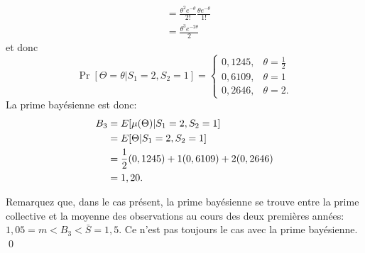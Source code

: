 \begin{exemple}
\begin{enumerate}[a)]
\begin{align*}
      &= \frac{\theta^2 e^{-\theta}}{2!} \frac{\theta e^{-\theta}}{1!} \\
      &= \frac{\theta^3 e^{-2\theta}}{2}
    \end{align*}
    et donc
    \begin{equation*}
      \Pr[\Theta = \theta|S_1 = 2, S_2 = 1] =
      \begin{cases}
        0,1245, & \theta = \frac{1}{2} \\
        0,6109, & \theta = 1 \\
        0,2646, & \theta = 2.
      \end{cases}
    \end{equation*}
    La prime bayésienne est donc:
    \begin{align*}
      B_3
      &= E [ \mu(\Theta)|S_1 = 2, S_2 = 1 ] \\
      &= E [ \Theta|S_1 = 2, S_2 = 1 ] \\
      &= \frac{1}{2} (0,1245) + 1 (0,6109) + 2 (0,2646) \\
      &= 1,20.
    \end{align*}
  \end{enumerate}

  Remarquez que, dans le cas présent, la prime bayésienne se trouve
  entre la prime collective et la moyenne des observations au cours
  des deux premières années: $1,05 = m < B_3 < \bar{S} = 1,5$. Ce
  n'est pas toujours le cas avec la prime bayésienne. %
  \qed
\end{exemple}


